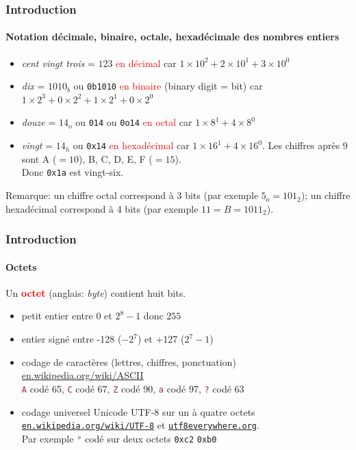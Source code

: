 \documentclass[xcolor=svgnames,final,smaller,a4]{beamer}
\begin{document}
\begin{frame}
  \frametitle{Introduction}
  \framesubtitle{Notation décimale, binaire,  octale, hexadécimale des nombres entiers}


  \begin{itemize}
    \item
    \textit
   {cent vingt trois} = $123$ \textcolor{red}{en décimal}
  car $1 \times 10^2 + 2 \times 10^1 + 3 \times 10^0$

  \item
  \textit{dix} = $1010_b$ ou \texttt{0b1010}
  \textcolor{red}{en binaire} (binary digit = bit)
  car $1  \times 2^3 + 0 \times 2^2 + 1 \times 2^1 + 0 \times 2^0$

  \item
  \textit{douze} = $14_o$ ou \texttt{014} ou \texttt{0o14}
  \textcolor{red}{en octal}
  car $1  \times 8^1 + 4 \times 8^0$

  \item \textit{vingt} =  $14_h$ ou \texttt{0x14}
  \textcolor{red}{en hexadécimal}
  car $1  \times 16^1 + 4 \times 16^0$. Les chiffres après 9 sont A ($=10$), B, C, D, E, F ($=15$). \\
  Donc \texttt{0x1a} est vingt-six.
 
  \end{itemize}
  
  \vspace{1cm}
  Remarque: un chiffre octal correspond à 3 bits (par exemple $5_o = 101_2$); un chiffre hexadécimal correspond à 4 bits (par exemple $11 = B = 1011_2$).
\end{frame}
\begin{frame}
  \frametitle{Introduction}
  \framesubtitle{Octets}

Un  \textcolor{red}{\textbf{octet}} (anglais: \textit{byte}) contient huit bits.

\begin{itemize}
\item petit entier entre $0$ et $2^8-1$ donc $255$

\item entier signé entre -128 ($-2^7$) et +127 ($2^7-1$)

\item codage de caractères (lettres, chiffres, ponctuation)
  \href{https://en.wikipedia.org/wiki/ASCII}{en.wikipedia.org/wiki/ASCII}\\
  \textcolor{brown}{\texttt{A}} codé 65,  \textcolor{brown}{\texttt{C}} codé 67,  \textcolor{brown}{\texttt{Z}} codé 90,   \textcolor{brown}{\texttt{a}} codé 97,  \textcolor{brown}{\texttt{?}} codé 63

\item codage universel Unicode UTF-8 sur un à quatre octets
\href{https://en.wikipedia.org/wiki/UTF-8}{\texttt{en.wikipedia.org/wiki/UTF-8}}
et \href{https://utf8everywhere.org/}{\texttt{utf8everywhere.org}}. \\ Par exemple \textcolor{brown}{\texttt{°}} codé sur deux octets \texttt{0xc2} \texttt{0xb0}

\end{itemize}
\end{frame}
\end{document}

